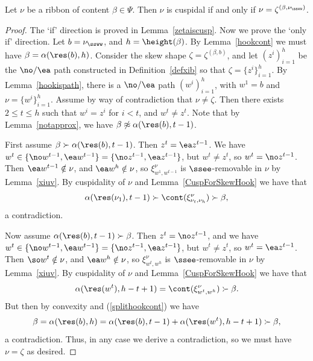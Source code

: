 \begin{lemma}\label{onlycuspribbon}
Let \(\nu\) be a ribbon of content \(\beta \in \Psi\). Then \(\nu\) is cuspidal if and only if \(\nu = \zeta^{(\beta, \nu_{\ssww})}\).
\end{lemma}
\begin{proof}
The `if' direction is proved in Lemma~\ref{zetaiscusp}. Now we prove the `only if' direction. Let \(b =\nu_{\ssww}\), and \(h = \height(\beta)\). By Lemma~\ref{hookcont} we must have \(\beta = \alpha(\res(b),h)\). Consider the skew shape \(\zeta = \zeta^{(\beta,b)}\), and let \((z^i)_{i=1}^h\) be the \(\no/\ea\) path constructed in Definition~\ref{defxib} so that \(\zeta = \{z^i\}_{i=1}^h\). By Lemma~\ref{hookispath}, there is a \(\no/\ea\) path \((w^i)_{i=1}^h\), with \(w^1 = b\) and \(\nu = \{w^i\}_{i=1}^h\). Assume by way of contradiction that \(\nu \neq \zeta\). Then there exists \(2 \leq t \leq h\) such that \(w^i = z^i\) for \(i<t\), and \(w^t \neq z^t\). Note that by Lemma~\ref{notapprox}, we have \(\beta \not \approx \alpha(\res(b),t-1)\).

First assume \(\beta \succ \alpha(\res(b),t-1)\). Then \(z^t = \ea z^{t-1}\).
We have \(w^t \in \{\no w^{t-1}, \ea w^{t-1}\} = \{\no z^{t-1}, \ea z^{t-1}\}\), but \(w^t \neq z^t\), so \(w^t = \no z^{t-1}\). Then \(\ea w^{t-1} \notin \nu\), and \(\ea w^h \notin \nu\), so \(\xi^\nu_{w^1, w^{t-1}}\) is \(\ssee\)-removable in \(\nu\) by Lemma~\ref{xiuv}. By cuspidality of \(\nu\) and Lemma~\ref{CuspForSkewHook} we have that
\begin{align*}
\alpha(\res(\nu_1), t-1) \succ \cont(\xi^\nu_{\nu_t, \nu_h}) \succ \beta,
\end{align*}
a contradiction.

Now assume \(\alpha(\res(b),t-1) \succ \beta\). Then \(z^t = \no z^{t-1}\), and we have \(w^t \in \{\no w^{t-1}, \ea w^{t-1}\} = \{\no z^{t-1}, \ea z^{t-1}\}\), but \(w^t \neq z^t\), so \(w^t = \ea z^{t-1}\). Then \(\so w^t \notin \nu\), and \(\ea w^h \notin \nu\), so \(\xi^\nu_{w^t, w^h}\) is \(\ssee\)-removable in \(\nu\) by Lemma~\ref{xiuv}. By cuspidality of \(\nu\) and Lemma~\ref{CuspForSkewHook} we have that
\begin{align*}
\alpha(\res(w^t), h-t + 1) = \cont(\xi^\nu_{w^t, w^h}) \succ \beta.
\end{align*}
But then by convexity and (\ref{splithookcont}) we have
\begin{align*}
\beta = \alpha(\res(b), h) =  \alpha(\res(b),t-1) + \alpha(\res(w^t), h-t + 1) \succ \beta,
\end{align*}
a contradiction. Thus, in any case we derive a contradiction, so we must have \(\nu = \zeta\) as desired.
\end{proof}


